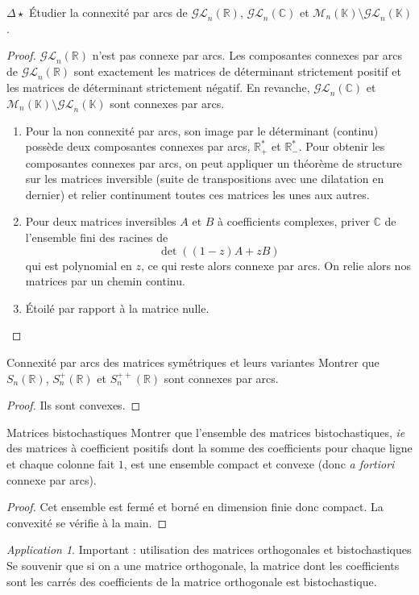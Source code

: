 \documentclass[french,a4paper]{article}
\newcommand{\R}{\mathbb{R}}
\newcommand{\C}{\mathbb{C}}
\newcommand{\K}{\mathbb{K}}
\newcommand{\st}{^*}
\theoremstyle{plain}
\theoremstyle{definition}
\theoremstyle{remark}
\newtheorem*{app}{Application}
\begin{document}
\begin{ex}{$\Delta\star$}
	Étudier la connexité par arcs de $\mathcal{GL}_n(\R)$, $\mathcal{GL}_n(\C)$ et $\mathcal{M}_n(\K)\setminus\mathcal{GL}_n(\K)$.
\end{ex}
\begin{proof}
	$\mathcal{GL}_n(\R)$ n'est pas connexe par arcs. Les composantes connexes par arcs de $\mathcal{GL}_n(\R)$ sont exactement les matrices de déterminant strictement positif et les matrices de déterminant strictement négatif. En revanche, $\mathcal{GL}_n(\C)$ et $\mathcal{M}_n(\K)\setminus\mathcal{GL}_n(\K)$ sont connexes par arcs.
	\begin{enumerate}
		\item Pour la non connexité par arcs, son image par le déterminant (continu) possède deux composantes connexes par arcs, $\R_+\st$ et $\R_-\st$. Pour obtenir les composantes connexes par arcs, on peut appliquer un théorème de structure sur les matrices inversible (suite de transpositions avec une dilatation en dernier) et relier continument toutes ces matrices les unes aux autres.
		\item Pour deux matrices inversibles $A$ et $B$ à coefficients complexes, priver $\C$ de l'ensemble fini des racines de $$\det((1-z)A+zB)$$ qui est polynomial en $z$, ce qui reste alors connexe par arcs. On relie alors nos matrices par un chemin continu.
		\item Étoilé par rapport à la matrice nulle.
	\end{enumerate}
\end{proof}

\begin{ex}{Connexité par arcs des matrices symétriques et leurs variantes}
	Montrer que $S_n(\R)$, $S_n^+(\R)$ et $S_n^{++}(\R)$ sont connexes par arcs.
\end{ex}
\begin{proof}
	Ils sont convexes.
\end{proof}

\begin{ex}{Matrices bistochastiques} 
	Montrer que l'ensemble des matrices bistochastiques, \textit{ie} des matrices à coefficient positifs dont la somme des coefficients pour chaque ligne et chaque colonne fait $1$, est une ensemble compact et convexe (donc \textit{a fortiori} connexe par arcs).
\end{ex}
\begin{proof}
	Cet ensemble est fermé et borné en dimension finie donc compact. La convexité se vérifie à la main.
\end{proof}
\begin{app}{Important : utilisation des matrices orthogonales et bistochastiques}
	Se souvenir que si on a une matrice orthogonale, la matrice dont les coefficients sont les carrés des coefficients de la matrice orthogonale est bistochastique.
\end{app}
\end{document}
